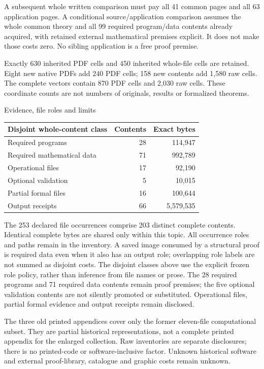 \documentclass[10pt]{article}
\begin{document}
A subsequent whole written comparison must pay all 41 common pages and all
63 application pages. A conditional source/application comparison assumes the
whole common theory and all 99 required program/data contents already acquired,
with retained external mathematical premises explicit. It does not make those
costs zero. No sibling application is a free proof premise.

Exactly 630 inherited PDF cells and 450 inherited whole-file cells are retained.
Eight new native PDFs add 240 PDF cells; 158 new contents add 1,580 raw cells.
The complete vectors contain 870 PDF cells and 2,030 raw cells. These coordinate
counts are not numbers of originals, results or formalized theorems.
\newpage
\begin{center}{\large Evidence, file roles and limits}\end{center}
\begin{center}\begin{tabular}{lrr}\toprule
Disjoint whole-content class & Contents & Exact bytes\\\midrule
Required programs & 28 & 114,947\\
Required mathematical data & 71 & 992,789\\
Operational files & 17 & 92,190\\
Optional validation & 5 & 10,015\\
Partial formal files & 16 & 100,644\\
Output receipts & 66 & 5,579,535\\
\bottomrule\end{tabular}\end{center}
The 253 declared file occurrences comprise 203 distinct complete contents.
Identical complete bytes are shared only within this topic. All occurrence
roles and paths remain in the inventory. A saved image consumed by a structural
proof is required data even when it also has an output role; overlapping role
labels are not summed as disjoint costs. The disjoint classes above use the
explicit frozen role policy, rather than inference from file names or prose.
The 28 required programs and 71 required data contents remain proof premises;
the five optional validation contents are not silently promoted or substituted.
Operational files, partial formal evidence and output receipts remain disclosed.

The three old printed appendices cover only the former eleven-file computational
subset. They are partial historical representations, not a complete printed
appendix for the enlarged collection. Raw inventories are separate disclosures;
there is no printed-code or software-inclusive factor. Unknown historical
software and external proof-library, catalogue and graphic costs remain unknown.
\end{document}
